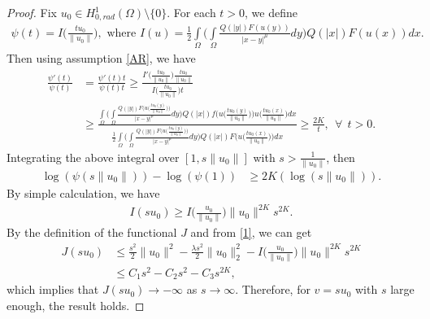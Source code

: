 \documentclass[11pt]{amsart}
\numberwithin{equation}{section}
\newcommand{\hr}{H^1_{0, rad}(\Omega)}
\newcommand{\1}{\frac{1}{2}}
\begin{document}
	\begin{proof}
		Fix $u_0 \in \hr\setminus \{0\}$. For each $t>0$, we define
		\begin{align}
			\psi(t)= I\Big( \frac{tu_0}{\|u_0\|}\Big), \text{ where } I(u)= \frac{1}{2}\int\limits_\Omega \Bigg( \int\limits_\Omega \frac{Q(|y|)F(u(y))}{|x-y|^\mu}dy\Bigg) Q(|x|)F(u(x))dx. \nonumber
		\end{align}
		Then using assumption \eqref{AR}, we have
		\begin{align}
			\frac{\psi'(t)}{\psi(t)} &= \frac{\psi'(t)t}{\psi(t)t}\geq \frac{I'\Big( \frac{tu_0}{\|u_0\|}\Big)\frac{tu_0}{\|u_0\|}}{I\Big( \frac{tu_0}{\|u_0\|}\Big)t}\nonumber\\
			&\geq \frac{ \displaystyle\int\limits_\Omega \Big( \int\limits_\Omega \frac{Q(|y|)F\Big(u\Big( \frac{tu_0(y)}{\|u_0\|}\Big)\Big)}{|x-y|^\mu}dy\Big) Q(|x|)f\Big(u\Big( \frac{tu_0(y)}{\|u_0\|}\Big)\Big) u \Big( \frac{tu_0(x)}{\|u_0\|}\Big)dx}{\displaystyle\1 \displaystyle\int\limits_\Omega \Big( \int\limits_\Omega \frac{Q(|y|)F\Big(u\Big( \frac{tu_0(y)}{\|u_0\|}\Big)\Big)}{|x-y|^\mu}dy\Big) Q(|x|)F\Big(u\Big( \frac{tu_0(x)}{\|u_0\|}\Big)\Big)dx}\nonumber\geq \frac{2K}{t}, \ \ \forall \ \ t>0. \nonumber
		\end{align}
		Integrating the above integral over $[1, s\|u_0\|]$ with $s> \frac{1}{\|u_0\|}$, then
		\begin{align}
			\log(\psi(s\|u_0\|))-\log(\psi(1))&\geq 2K (\log(s\|u_0\|)).\nonumber
		\end{align}
		By simple calculation, we have
		\begin{align}
			I(su_0) \geq I\Big(\frac{u_0}{\|u_0\|}\Big) \|u_0\|^{2K}s^{2K}. \label{1}
		\end{align}
		By the definition of the functional $J$ and from \eqref{1}, we can get
		\begin{align}
			J(su_0) &\leq \frac{s^2}{2}\|u_0\|^2-\frac{\lambda s^2}{2} \|u_0\|^2_2- I\Big(\frac{u_0}{\|u_0\|}\Big)\|u_0\|^{2K}s^{2K}\nonumber\\
			&\leq C_1s^2-C_2s^2-C_3s^{2K}, \nonumber
		\end{align}
		which implies that $J(su_0) \rightarrow -\infty$ as $s\rightarrow \infty$. Therefore, for $v=su_0$ with $s$ large enough, the result holds.
	\end{proof}
	
\end{document}
